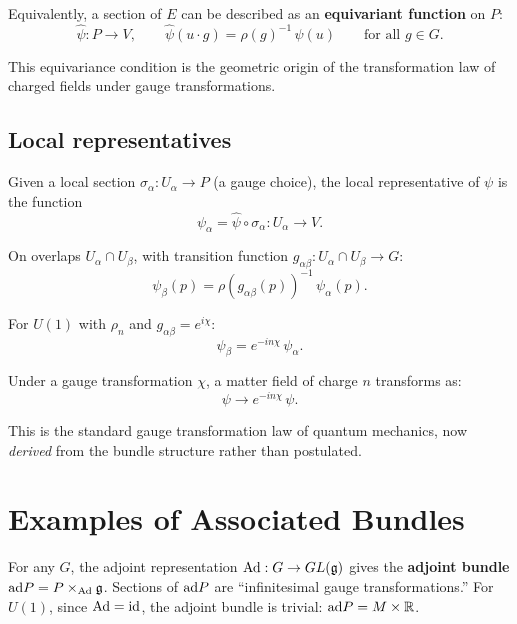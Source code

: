 Equivalently, a section of $E$ can be described as an \textbf{equivariant function} on $P$:
\begin{equation}
\hat{\psi}: P \to V, \qquad \hat{\psi}(u \cdot g) = \rho(g)^{-1}\,\hat{\psi}(u) \qquad \text{for all } g \in G.
\end{equation}

This equivariance condition is the geometric origin of the transformation law of charged fields under gauge transformations.

\subsection{Local representatives}

Given a local section $\sigma_\alpha: U_\alpha \to P$ (a gauge choice), the local representative of $\psi$ is the function
\begin{equation}
\psi_\alpha = \hat{\psi} \circ \sigma_\alpha: U_\alpha \to V.
\end{equation}

On overlaps $U_\alpha \cap U_\beta$, with transition function $g_{\alpha\beta}: U_\alpha \cap U_\beta \to G$:
\begin{equation}
\boxed{\psi_\beta(p) = \rho(g_{\alpha\beta}(p))^{-1}\,\psi_\alpha(p).}
\end{equation}

For $U(1)$ with $\rho_n$ and $g_{\alpha\beta} = e^{i\chi}$:
\begin{equation}
\psi_\beta = e^{-in\chi}\,\psi_\alpha.
\end{equation}

Under a gauge transformation $\chi$, a matter field of charge $n$ transforms as:
\begin{equation}
\psi \to e^{-in\chi}\,\psi.
\end{equation}

This is the standard gauge transformation law of quantum mechanics, now \emph{derived} from the bundle structure rather than postulated.

\section{Examples of Associated Bundles}

\begin{example}
For any $G$, the adjoint representation $\mathrm{Ad}: G \to GL(\mathfrak{g})$ gives the \textbf{adjoint bundle} $\mathrm{ad} P = P \times_{\mathrm{Ad}} \mathfrak{g}$. Sections of $\mathrm{ad} P$ are ``infinitesimal gauge transformations.'' For $U(1)$, since $\mathrm{Ad} = \mathrm{id}$, the adjoint bundle is trivial: $\mathrm{ad} P = M \times \mathbb{R}$.
\end{example}

